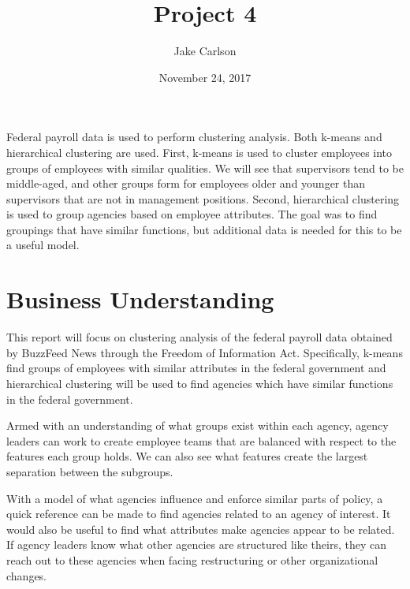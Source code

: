 \documentclass{article}
\begin{document}
\title{Project 4}
\author{Jake Carlson}
\date{November 24, 2017}
\maketitle

\abstract
Federal payroll data is used to perform clustering analysis. Both k-means and hierarchical clustering are used. First, k-means is used to cluster employees into groups of employees with similar qualities. We will see that supervisors tend to be middle-aged, and other groups form for employees older and younger than supervisors that are not in management positions. Second, hierarchical clustering is used to group agencies based on employee attributes. The goal was to find groupings that have similar functions, but additional data is needed for this to be a useful model.

\newpage

\tableofcontents
\newpage

\section{Business Understanding}
This report will focus on clustering analysis of the federal payroll data obtained by BuzzFeed News through the Freedom of Information Act. Specifically, k-means find groups of employees with similar attributes in the federal government and hierarchical clustering will be used to find agencies which have similar functions in the federal government.
\par
Armed with an understanding of what groups exist within each agency, agency leaders can work to create employee teams that are balanced with respect to the features each group holds. We can also see what features create the largest separation between the subgroups.
\par
With a model of what agencies influence and enforce similar parts of policy, a quick reference can be made to find agencies related to an agency of interest. It would also be useful to find what attributes make agencies appear to be related. If agency leaders know what other agencies are structured like theirs, they can reach out to these agencies when facing restructuring or other organizational changes.
\end{document}
